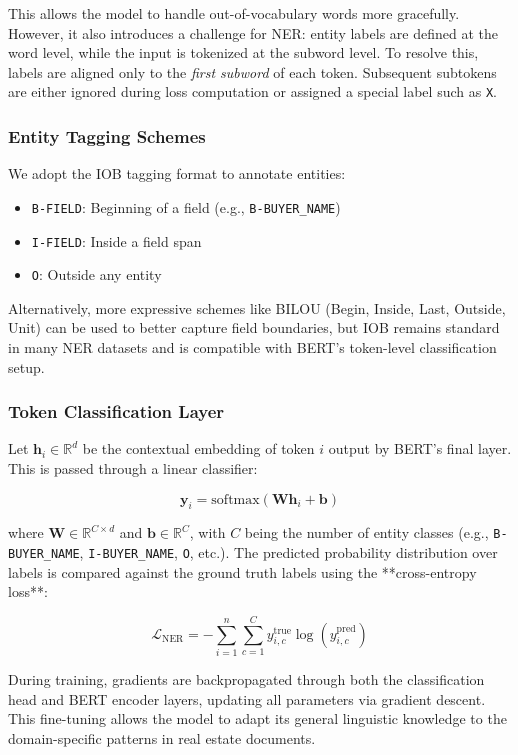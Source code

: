 \documentclass{article}
\begin{document}
This allows the model to handle out-of-vocabulary words more gracefully. However, it also introduces a challenge for NER: entity labels are defined at the word level, while the input is tokenized at the subword level. To resolve this, labels are aligned only to the \emph{first subword} of each token. Subsequent subtokens are either ignored during loss computation or assigned a special label such as \texttt{X}.

\subsubsection{Entity Tagging Schemes}

We adopt the IOB tagging format \cite{ramshaw1995text} to annotate entities:
\begin{itemize}
    \item \texttt{B-FIELD}: Beginning of a field (e.g., \texttt{B-BUYER\_NAME})
    \item \texttt{I-FIELD}: Inside a field span
    \item \texttt{O}: Outside any entity
\end{itemize}

Alternatively, more expressive schemes like BILOU (Begin, Inside, Last, Outside, Unit) \cite{ratinov2009design} can be used to better capture field boundaries, but IOB remains standard in many NER datasets and is compatible with BERT’s token-level classification setup.

\subsubsection{Token Classification Layer}

Let $\mathbf{h}_i \in \mathbb{R}^d$ be the contextual embedding of token $i$ output by BERT's final layer. This is passed through a linear classifier:

\[
\mathbf{y}_i = \text{softmax}(\mathbf{W} \mathbf{h}_i + \mathbf{b})
\]

where $\mathbf{W} \in \mathbb{R}^{C \times d}$ and $\mathbf{b} \in \mathbb{R}^C$, with $C$ being the number of entity classes (e.g., \texttt{B-BUYER\_NAME}, \texttt{I-BUYER\_NAME}, \texttt{O}, etc.). The predicted probability distribution over labels is compared against the ground truth labels using the **cross-entropy loss**:

\[
\mathcal{L}_{\text{NER}} = -\sum_{i=1}^{n} \sum_{c=1}^{C} y_{i,c}^{\text{true}} \log(y_{i,c}^{\text{pred}})
\]

During training, gradients are backpropagated \cite{rumelhart1986learning} through both the classification head and BERT encoder layers, updating all parameters via gradient descent. This fine-tuning allows the model to adapt its general linguistic knowledge to the domain-specific patterns in real estate documents.
\end{document}
